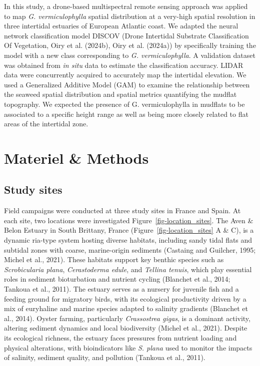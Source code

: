 \documentclass[
  letterpaper,
  DIV=11,
  numbers=noendperiod]{scrartcl}
\begin{document}
In this study, a drone-based multispectral remote sensing approach was
applied to map \emph{G. vermiculophylla} spatial distribution at a
very-high spatial resolution in three intertidal estuaries of European
Atlantic coast. We adapted the neural network classification model
DISCOV (Drone Intertidal Substrate Classification Of Vegetation, Oiry et
al. (2024b), Oiry et al. (2024a)) by specifically training the model
with a new class corresponding to \emph{G. vermiculophylla}. A
validation dataset was obtained from \emph{in situ} data to estimate the
classification accuracy. LIDAR data were concurrently acquired to
accurately map the intertidal elevation. We used a Generalized Additive
Model (GAM) to examine the relationship between the seaweed spatial
distribution and spatial metrics quantifying the mudflat topography. We
expected the presence of G. vermiculophylla in mudflats to be associated
to a specific height range as well as being more closely related to flat
areas of the intertidal zone.

\section{Materiel \& Methods}\label{materiel-methods}

\subsection{Study sites}\label{study-sites}

Field campaigns were conducted at three study sites in France and Spain.
At each site, two locations were investigated
Figure~\ref{fig-location_sites}. The Aven \& Belon Estuary in South
Brittany, France (Figure~\ref{fig-location_sites} A \& C), is a dynamic
ria-type system hosting diverse habitats, including sandy tidal flats
and subtidal zones with coarse, marine-origin sediments (Castaing and
Guilcher, 1995; Michel et al., 2021). These habitats support key benthic
species such as \emph{Scrobicularia plana}, \emph{Cerastoderma edule},
and \emph{Tellina tenuis}, which play essential roles in sediment
bioturbation and nutrient cycling (Blanchet et al., 2014; Tankoua et
al., 2011). The estuary serves as a nursery for juvenile fish and a
feeding ground for migratory birds, with its ecological productivity
driven by a mix of euryhaline and marine species adapted to salinity
gradients (Blanchet et al., 2014). Oyster farming, particularly
\emph{Crassostrea gigas}, is a dominant activity, altering sediment
dynamics and local biodiversity (Michel et al., 2021). Despite its
ecological richness, the estuary faces pressures from nutrient loading
and physical alterations, with bioindicators like \emph{S. plana} used
to monitor the impacts of salinity, sediment quality, and pollution
(Tankoua et al., 2011).
\end{document}
